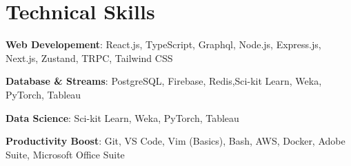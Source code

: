 \documentclass[a4paper,11pt]{article}
\begin{document}
\section{Technical Skills}
\begin{itemize}[leftmargin=0.15in, label={}]
	\setlength\itemsep{-2pt}
	\small{\item{
		\textbf{Web Developement}{: React.js, TypeScript, Graphql, Node.js, Express.js, Next.js, Zustand, TRPC, Tailwind CSS} \\
		}
		\item{
		      \textbf{Database \& Streams}{: PostgreSQL, Firebase, Redis,Sci-kit Learn, Weka, PyTorch, Tableau} \\
		}
		\item{
		      \textbf{Data Science}{: Sci-kit Learn, Weka, PyTorch, Tableau} \\
		}
		\item{
		      \textbf{Productivity Boost}{: Git, VS Code, Vim (Basics), Bash, AWS, Docker, Adobe Suite, Microsoft Office Suite}
	}
 }
\end{itemize}



\end{document}
